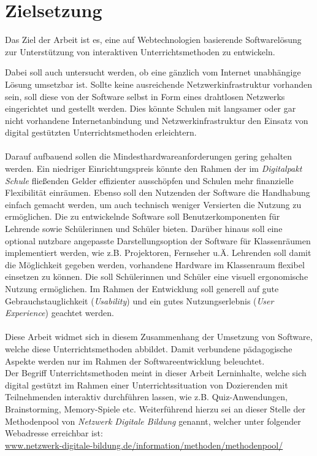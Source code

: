 \section{Zielsetzung}\label{sec:zielsetzung}

Das Ziel der Arbeit ist es, eine auf Webtechnologien basierende Softwarelösung zur Unterstützung von interaktiven Unterrichtsmethoden zu entwickeln.

Dabei soll auch untersucht werden, ob eine gänzlich vom Internet unabhängige Lösung umsetzbar ist. Sollte keine ausreichende Netzwerkinfrastruktur vorhanden sein, soll diese von der Software selbst in Form eines drahtlosen Netzwerks eingerichtet und gestellt werden. Dies könnte 
Schulen mit langsamer oder gar nicht vorhandene Internetanbindung und Netzwerkinfrastruktur den Einsatz von 
digital gestützten Unterrichtsmethoden erleichtern. 
\\ \\
Darauf aufbauend sollen die Mindesthardwareanforderungen gering gehalten werden. 
Ein niedriger Einrichtungspreis könnte den Rahmen der im \emph{Digitalpakt Schule} fließenden Gelder effizienter ausschöpfen und Schulen mehr finanzielle Flexibilität einräumen. 
Ebenso soll den Nutzenden der Software die Handhabung einfach gemacht werden, um auch technisch weniger Versierten die Nutzung zu ermöglichen. Die zu entwickelnde Software soll Benutzerkomponenten für Lehrende sowie Schülerinnen und Schüler bieten. Darüber hinaus soll eine
optional nutzbare angepasste Darstellungsoption der Software für Klassenräumen implementiert werden, wie z.B. Projektoren, Fernseher u.Ä. Lehrenden soll damit die Möglichkeit gegeben werden, vorhandene Hardware im Klassenraum flexibel einsetzen zu können. Die soll Schülerinnen und Schüler eine visuell ergonomische Nutzung ermöglichen. 
Im Rahmen der Entwicklung soll generell auf gute Gebrauchstauglichkeit (\emph{Usability}) und ein gutes Nutzungserlebnis (\emph{User Experience}) geachtet werden.  
\\ \\
Diese Arbeit widmet sich in diesem Zusammenhang der Umsetzung von Software, welche diese Unterrichtsmethoden abbildet. Damit verbundene pädagogische Aspekte werden nur im Rahmen der Softwareentwicklung beleuchtet.
\\
Der Begriff Unterrichtsmethoden meint in dieser Arbeit Lerninhalte, welche sich digital gestützt im Rahmen einer Unterrichtssituation von Dozierenden mit Teilnehmenden interaktiv durchführen lassen, wie z.B. Quiz-Anwendungen, Brainstorming, Memory-Spiele etc. Weiterführend hierzu sei an dieser Stelle der
Methodenpool von \textit{Netzwerk Digitale Bildung} \cite{NDB} genannt, welcher unter folgender Webadresse erreichbar ist: \\
\url{www.netzwerk-digitale-bildung.de/information/methoden/methodenpool/}
\\ \\
